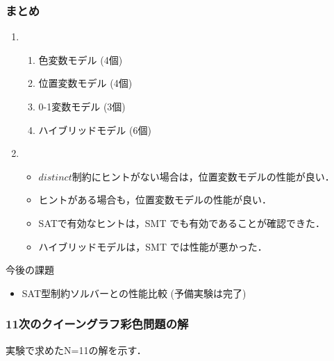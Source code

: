 \documentclass [dvipdfmx,11pt]{beamer}
\newcommand{\distinct}{$distinct$}
\begin{document}
\begin{frame}\frametitle{まとめ}
  \begin{enumerate}
  \item {}
    \begin{enumerate}
      \item 色変数モデル (4個)%
      \item 位置変数モデル (4個)%
      \item 0-1変数モデル (3個)%
      \item ハイブリッドモデル (6個)%
    \end{enumerate}
  \item {}
    \begin{itemize}
    \item {\distinct}制約にヒントがない場合は，位置変数モデルの性能が良い．
    \item ヒントがある場合も，位置変数モデルの性能が良い．
    \item SATで有効なヒントは，SMT でも有効であることが確認できた．
    \item ハイブリッドモデルは，SMT では性能が悪かった．
  \end{itemize}
  \end{enumerate}
  
  \begin{alertblock}{今後の課題}
    \begin{itemize}
    \item SAT型制約ソルバーとの性能比較 (予備実験は完了)
    \end{itemize}
  \end{alertblock}

\end{frame}

\begin{frame}
    \frametitle{11次のクイーングラフ彩色問題の解}
    実験で求めたN=11の解を示す．
    
\end{frame}




\end{document}
